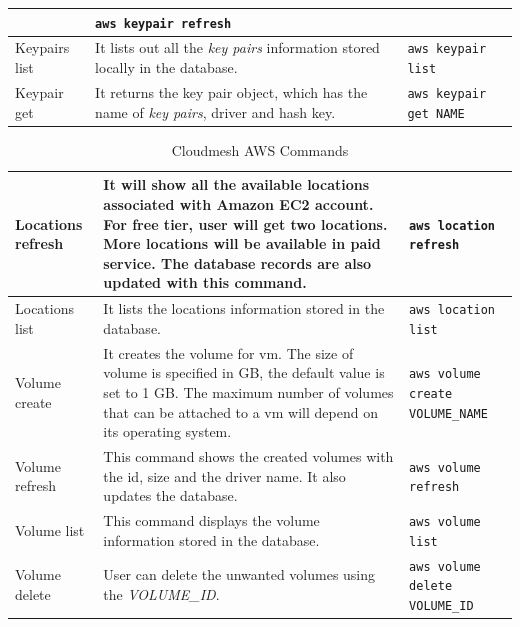 \documentclass[9pt,twocolumn,twoside]{../../styles/osajnl}
\begin{document}
\begin{table}[p]
\begin{center}
\begin{tabular}{p{2cm}p{10cm}p{5cm}}
                         & \verb+aws keypair refresh+ \\
  \hline
  Keypairs list & It lists out all the \textit{key pairs} information stored locally in the database.
                         & \verb+aws keypair list+ \\
  \hline
  Keypair get & It returns the key pair object, which has the name of \textit{key pairs}, driver and hash key.
                         & \verb+aws keypair get NAME+ \\
  \hline
\end{tabular}
\end{center}
\end{table}


\begin{table}[htb]
\caption{Cloudmesh AWS Commands}\label{T:aws-commands} 
\begin{center}
\begin{tabular}{p{2cm}p{10cm}p{5cm}}
  Locations refresh & It will show all the available locations associated with Amazon EC2 account. For free tier, user will get two locations. More locations will be available in paid service. The database records are also updated with this command.
                         & \verb+aws location refresh+ \\
  \hline
  Locations list & It lists the locations information stored in the database.
                         & \verb+aws location list+ \\
  \hline
  Volume create & It creates the volume for vm. The size of volume is specified in GB, the default value is set to 1 GB. The maximum number of volumes that can be attached to a vm will depend on its operating system.
                         & \verb+aws volume create VOLUME_NAME+ \\
  \hline
  Volume refresh & This command shows the created volumes with the id, size and the driver name. It also updates the database.
                         & \verb+aws volume refresh+ \\
  \hline
  Volume list & This command displays the volume information stored in the database.
                         & \verb+aws volume list+ \\
  \hline
  Volume delete & User can delete the unwanted volumes using the \textit{VOLUME\_ID}.
                         & \verb+aws volume delete VOLUME_ID+ \\
\end{tabular}
\end{center}
\end{table}
\end{document}
